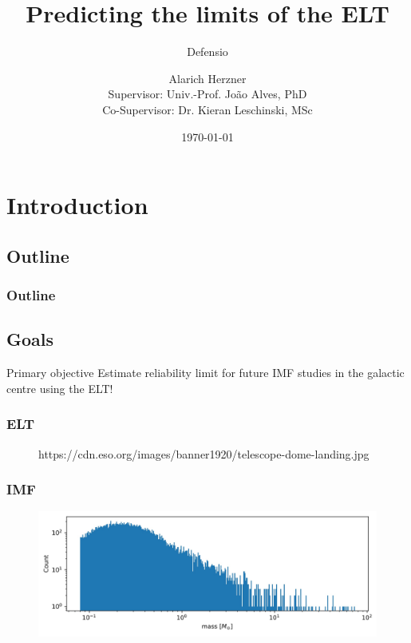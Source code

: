 \documentclass{beamer}
\title{Predicting the limits of the ELT}
\subtitle{Defensio}
\author[Alarich Herzner]{Alarich Herzner\\[1ex]  {\small Supervisor: Univ.-Prof. Jo\~ao Alves, PhD \\ Co-Supervisor: Dr. Kieran Leschinski, MSc}}
\institute{University of Vienna, Faculty of Physics}
\date{\today}
\begin{document}
\begin{frame}
\titlepage
\end{frame}

\section{Introduction}

\subsection{Outline}

\begin{frame}
\frametitle{Outline}
\tableofcontents[hideallsubsections] 
\end{frame}


\subsection{Goals}

\begin{frame}
\begin{block}{Primary objective}
Estimate reliability limit for future IMF studies in the galactic centre using the ELT!
\end{block}
\end{frame}

\begin{frame}
\frametitle{ELT}
  \begin{figure}
                  {https://cdn.eso.org/images/banner1920/telescope-dome-landing.jpg}
  \end{figure}
\end{frame}

\begin{frame}
\frametitle{IMF}
  \begin{figure}
  \includegraphics[width=\linewidth]{Images/IMF1.jpg}
  \end{figure}
\end{frame}
\end{document}
